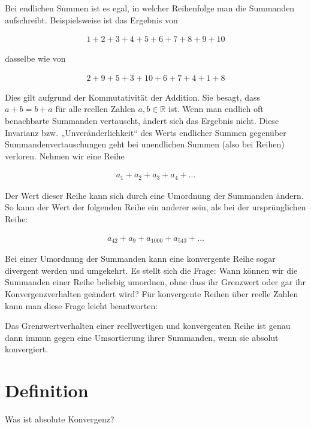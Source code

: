 \documentclass[fontsize=9pt,
               parskip=half-,
               DIV=14,
               listof=chapterentry,
               tocflat]{scrbook}
\begin{document}
Bei endlichen Summen ist es egal, in welcher Reihenfolge man die Summanden aufschreibt. Beispielsweise ist das Ergebnis von

\begin{align*}
1+2+3+4+5+6+7+8+9+10
\end{align*}

dasselbe wie von

\begin{align*}
2+9+5+3+10+6+7+4+1+8
\end{align*}

Dies gilt aufgrund der Kommutativität der Addition. Sie besagt, dass $a+b=b+a$ für alle reellen Zahlen $a,b\in \mathbb {R} $ ist. Wenn man endlich oft benachbarte Summanden vertauscht, ändert sich das Ergebnis nicht. Diese Invarianz bzw. „Unveränderlichkeit“ des Werts endlicher Summen gegenüber Summandenvertauschungen geht bei unendlichen Summen (also bei Reihen) verloren. Nehmen wir eine Reihe

\begin{align*}
a_{1}+a_{2}+a_{3}+a_{4}+\ldots 
\end{align*}

Der Wert dieser Reihe kann sich durch eine Umordnung der Summanden ändern. So kann der Wert der folgenden Reihe ein anderer sein, als bei der ursprünglichen Reihe:

\begin{align*}
a_{42}+a_{9}+a_{1000}+a_{543}+\ldots 
\end{align*}

Bei einer Umordnung der Summanden kann eine konvergente Reihe sogar divergent werden und umgekehrt. Es stellt sich die Frage: Wann können wir die Summanden einer Reihe beliebig umordnen, ohne dass ihr Grenzwert oder gar ihr Konvergenzverhalten geändert wird? Für konvergente Reihen über reelle Zahlen kann man diese Frage leicht beantworten:

\begin{importantparagraph*}
Das Grenzwertverhalten einer reellwertigen und konvergenten Reihe ist genau dann immun gegen eine Umsortierung ihrer Summanden, wenn sie absolut konvergiert.

\end{importantparagraph*}

\section{Definition}

Was ist absolute Konvergenz?
\end{document}
